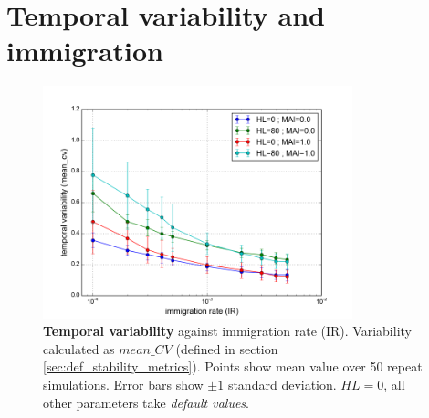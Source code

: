 %
%


\clearpage
\section{Temporal variability and immigration}
\label{sec:intro_stationarity}

\begin{figure}
	\centering
	\includegraphics[width=0.8\textwidth]{"figures/stationarity/cov_vs_ir"}
	\caption[Temporal variability versus immigration rate.]{\textbf{Temporal variability} against immigration rate (IR). Variability calculated as $mean\_CV$ (defined in section \ref{sec:def_stability_metrics}). Points show mean value over 50 repeat simulations. Error bars show $\pm 1$ standard deviation. $HL=0$, all other parameters take \emph{default values}.}
	\label{fig:cov_vs_ir}
\end{figure}

